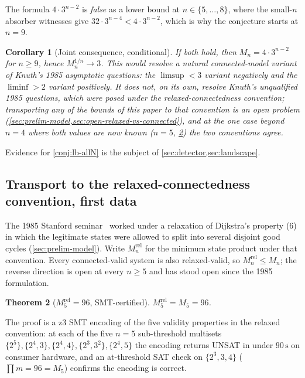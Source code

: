 \documentclass[11pt,a4paper]{article}
\theoremstyle{plain}
\newtheorem{theorem}{Theorem}
\newtheorem{corollary}[theorem]{Corollary}
\theoremstyle{definition}
\newcommand{\Mn}{M_n}
\begin{document}
The formula $4 \cdot 3^{n-2}$ is \emph{false} as a lower bound at
$n \in \{5, \ldots, 8\}$, where the small-$n$ absorber witnesses
give $32 \cdot 3^{n-4} < 4 \cdot 3^{n-2}$, which is why the
conjecture starts at $n = 9$.

\begin{corollary}[Joint consequence, conditional]\label{cor:asymptotic}
If  both hold, then $\Mn = 4 \cdot
3^{n-2}$ for $n \ge 9$, hence $\Mn^{1/n} \to 3$.  This would
resolve a natural connected-model variant of Knuth's 1985
asymptotic questions: the $\limsup < 3$ variant negatively and the
$\liminf > 2$ variant positively.  It does \emph{not}, on its own,
resolve Knuth's unqualified 1985 questions, which were posed under
the relaxed-connectedness convention; transporting any of the
bounds of this paper to that convention is an open problem
(\cref{sec:prelim-model,sec:open-relaxed-vs-connected}), and at
the one case beyond $n = 4$ where both values are now known
($n = 5$, \cref{thm:m5rel}) the two conventions agree.
\end{corollary}

Evidence for \cref{conj:lb-allN} is the subject of
\cref{sec:detector,sec:landscape}.

\subsection{Transport to the relaxed-connectedness convention, first data}\label{sec:main-relaxed}

The 1985 Stanford seminar~\cite{HaddadKnuth1985} worked under a
relaxation of Dijkstra's property (6) in which the legitimate
states were allowed to split into several disjoint good cycles
(\cref{sec:prelim-model}).  Write $\Mn^{\mathrm{rel}}$ for the
minimum state product under that convention.  Every
connected-valid system is also relaxed-valid, so
$\Mn^{\mathrm{rel}} \le \Mn$; the reverse direction is open at
every $n \ge 5$ and has stood open since the 1985 formulation.

\begin{theorem}[$M_5^{\mathrm{rel}} = 96$, SMT-certified]\label{thm:m5rel}
$M_5^{\mathrm{rel}} = M_5 = 96$.
\end{theorem}

The proof is a z3 SMT encoding of the five validity properties in
the relaxed convention: at each of the five $n = 5$ sub-threshold
multisets $\{2^5\}, \{2^4, 3\}, \{2^4, 4\}, \{2^3, 3^2\}, \{2^4, 5\}$
the encoding returns UNSAT in under $90\,\mathrm{s}$ on consumer
hardware, and an at-threshold SAT check on $\{2^3, 3, 4\}$
($\prod m = 96 = M_5$) confirms the encoding is correct.
\end{document}
